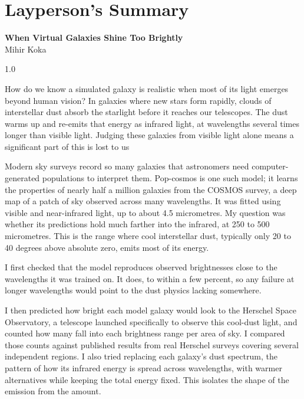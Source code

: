 \documentclass[12pt,a4paper]{article}
\begin{document}
\section*{\centering Layperson's Summary}
\vspace{-0.3cm}
\begin{center}
{\normalsize\bfseries When Virtual Galaxies Shine Too Brightly}\\[2pt]
{\small Mihir Koka}
\end{center}
\begin{spacing}{1.0}

How do we know a simulated galaxy is realistic when most of its light emerges beyond
human vision? In galaxies where new stars form rapidly, clouds of interstellar
dust absorb the starlight before it reaches our telescopes. The dust warms up and
re-emits that energy as infrared light, at wavelengths several times
longer than visible light. Judging these galaxies from visible light alone means a significant part of this is lost to us

Modern sky surveys record so many galaxies that astronomers need computer-generated
populations to interpret them. Pop-cosmos is one such model; it learns the
properties of nearly half a million galaxies from the COSMOS survey, a deep map of a
patch of sky observed across many wavelengths. It was fitted using visible and
near-infrared light, up to about 4.5 micrometres. My question was whether its
predictions hold much farther into the infrared, at 250 to 500 micrometres. This is
the range where cool interstellar dust, typically only 20 to 40 degrees above absolute
zero, emits most of its energy.

I first checked that the model reproduces observed brightnesses close to the
wavelengths it was trained on. It does, to within a few percent, so any failure at
longer wavelengths would point to the dust physics lacking somewhere.

I then predicted how bright each model galaxy would look to the Herschel Space
Observatory, a telescope launched specifically to observe this cool-dust light, and
counted how many fall into each brightness range per area of sky. I compared those
counts against published results from real Herschel surveys covering several
independent regions. I also tried replacing each galaxy's dust spectrum, the pattern of how its infrared
energy is spread across wavelengths, with warmer alternatives while keeping the total
energy fixed. This isolates the shape of the emission from the amount.


\end{spacing}
\end{document}
